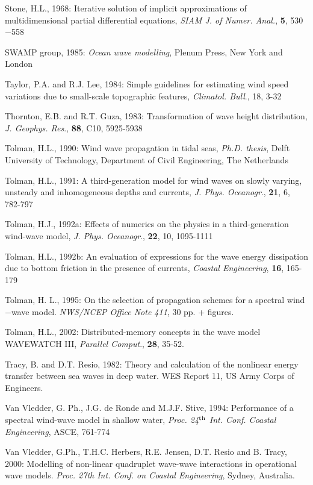 \documentclass[12pt]{book}
\begin{document}
\begin{thebibliography}{10}
Stone, H.L., 1968: Iterative solution of implicit approximations of multidimensional partial differential
equations, {\it SIAM J. of Numer. Anal.}, {\bf 5}, 530$-$558

SWAMP group, 1985: {\it Ocean wave modelling}, Plenum Press, New York and London

Taylor, P.A. and R.J. Lee, 1984: Simple guidelines for estimating wind speed variations due to small-scale
topographic features, {\it Climatol. Bull}., 18, 3-32

Thornton, E.B. and R.T. Guza, 1983: Transformation of wave height distribution, {\it J. Geophys. Res}., {\bf 88},
C10, 5925-5938

Tolman, H.L., 1990: Wind wave propagation in tidal seas, {\it Ph.D. thesis}, Delft University of Technology,
Department of Civil Engineering, The Netherlands

Tolman, H.L., 1991: A third-generation model for wind waves on slowly varying, unsteady and
inhomogeneous depths and currents, {\it J. Phys. Oceanogr}., {\bf 21}, 6, 782-797

Tolman, H.J., 1992a: Effects of numerics on the physics in a third-generation wind-wave model, {\it J. Phys.
Oceanogr}., {\bf 22}, 10, 1095-1111

Tolman, H.L., 1992b: An evaluation of expressions for the wave energy dissipation due to bottom friction
in the presence of currents, {\it Coastal Engineering}, {\bf 16}, 165-179

Tolman, H. L., 1995: On the selection of propagation schemes for a spectral wind$-$wave model.
{\it NWS/NCEP Office Note 411}, 30 pp. + figures.

Tolman, H.L., 2002: Distributed-memory concepts in the wave model {WAVEWATCH III},
{\it Parallel Comput}., {\bf 28}, 35-52.

Tracy, B. and D.T. Resio, 1982: Theory and calculation of the nonlinear energy transfer between
sea waves in deep water. WES Report 11, US Army Corps of Engineers.

Van Vledder, G. Ph., J.G. de Ronde and M.J.F. Stive, 1994: Performance of a spectral wind-wave model
in shallow water, {\it Proc. 24$^{{\rm th}}$ Int. Conf. Coastal Engineering}, ASCE, 761-774

Van Vledder, G.Ph., T.H.C. Herbers, R.E. Jensen, D.T. Resio and B. Tracy, 2000: Modelling
of non-linear quadruplet wave-wave interactions in operational wave models. {\it Proc. 27th Int.
Conf. on Coastal Engineering}, Sydney, Australia.


\end{thebibliography}
\end{document}

